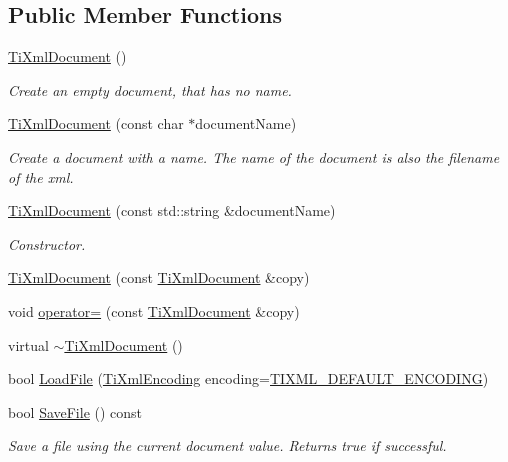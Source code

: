 \subsection*{Public Member Functions}
\begin{DoxyCompactItemize}
\item 
\hyperlink{class_ti_xml_document_a9f5e84335708fde98400230f9f12659c}{Ti\+Xml\+Document} ()
\begin{DoxyCompactList}\small\item\em Create an empty document, that has no name. \end{DoxyCompactList}\item 
\hyperlink{class_ti_xml_document_ae4508b452d0c3061db085f3db27b8396}{Ti\+Xml\+Document} (const char $\ast$document\+Name)
\begin{DoxyCompactList}\small\item\em Create a document with a name. The name of the document is also the filename of the xml. \end{DoxyCompactList}\item 
\hyperlink{class_ti_xml_document_a2c6e58fb99bfa76cc613f16840022225}{Ti\+Xml\+Document} (const std\+::string \&document\+Name)
\begin{DoxyCompactList}\small\item\em Constructor. \end{DoxyCompactList}\item 
\hyperlink{class_ti_xml_document_a323a7486e7da6099cdc19a5ff7e74b07}{Ti\+Xml\+Document} (const \hyperlink{class_ti_xml_document}{Ti\+Xml\+Document} \&copy)
\item 
void \hyperlink{class_ti_xml_document_aafbfacc3414008f619b1345775ef12a4}{operator=} (const \hyperlink{class_ti_xml_document}{Ti\+Xml\+Document} \&copy)
\item 
virtual \hyperlink{class_ti_xml_document_a1b8a035c2c2aab38e4387246a0b712c5}{$\sim$\+Ti\+Xml\+Document} ()
\item 
bool \hyperlink{class_ti_xml_document_a4c852a889c02cf251117fd1d9fe1845f}{Load\+File} (\hyperlink{tinyxml_8h_a88d51847a13ee0f4b4d320d03d2c4d96}{Ti\+Xml\+Encoding} encoding=\hyperlink{tinyxml_8h_ad5b8b092878e9010d6400cb6c13d4879}{T\+I\+X\+M\+L\+\_\+\+D\+E\+F\+A\+U\+L\+T\+\_\+\+E\+N\+C\+O\+D\+I\+NG})
\item 
bool \hyperlink{class_ti_xml_document_ab63b96a6af5a467e289c7c75202edad9}{Save\+File} () const
\begin{DoxyCompactList}\small\item\em Save a file using the current document value. Returns true if successful. \end{DoxyCompactList}\item 

\end{DoxyCompactItemize}
